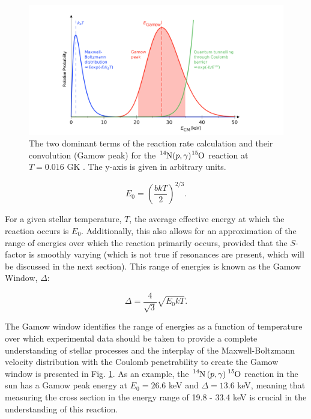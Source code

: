 \begin{figure}
\includegraphics[width=\linewidth]{figures/gamowWindow.png}
\caption{The two dominant terms of the reaction rate calculation and their convolution (Gamow peak) for the $\ce{^{14}N}(p,\gamma)\ce{^{15}O}$ reaction at $T = 0.016$ GK \cite{Bemmerer2004}. The y-axis is given in arbitrary units.}
\label{fig: Gamow Peak}
\end{figure}

\begin{equation}
E_{0} = \left( \dfrac{b k T}{2}  \right)^{2/3}. 
\label{eqn: GamowPeak}
\end{equation}

\noindent For a given stellar temperature, $T$, the average effective energy at which the reaction occurs is $E_{0}$. Additionally, this also allows for an approximation of the range of energies over which the reaction primarily occurs, provided that the $S$-factor is smoothly varying (which is not true if resonances are present, which will be discussed in the next section). This range of energies is known as the Gamow Window, $\Delta$:

\begin{equation}
\Delta = \dfrac{4}{\sqrt{3}} \sqrt{E_{0} k T}.
\label{eqn: Gamow window width}
\end{equation}

\noindent The Gamow window identifies the range of energies as a function of temperature over which experimental data should be taken to provide a complete understanding of stellar processes and the interplay of the Maxwell-Boltzmann velocity distribution with the Coulomb penetrability to create the Gamow window is presented in Fig. \ref{fig: Gamow Peak}. As an example, the $\ce{^{14}N} \left( p, \gamma \right) \ce{^{15}O}$ reaction in the sun has a Gamow peak energy at $E_{0} = 26.6$ keV and $\Delta = 13.6$ keV, meaning that measuring the cross section in the energy range of 19.8 - 33.4 keV is crucial in the understanding of this reaction. 

